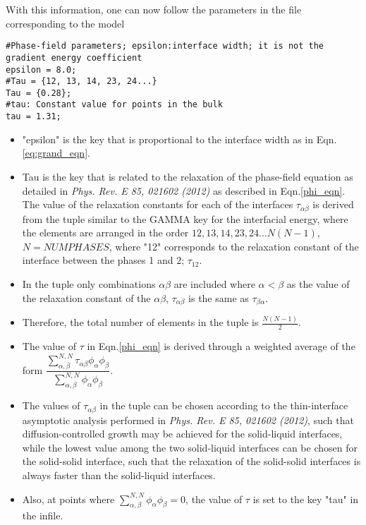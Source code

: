 \documentclass[a4paper,10pt]{article}
\begin{document}
With this information, one can now follow the parameters in the file corresponding to the model

\begin{lstlisting}
#Phase-field parameters; epsilon:interface width; it is not the gradient energy coefficient
epsilon = 8.0;
#Tau = {12, 13, 14, 23, 24...}
Tau = {0.28};
#tau: Constant value for points in the bulk
tau = 1.31;
\end{lstlisting}

\begin{itemize}
 \item "epsilon" is the key that is proportional to the interface width as in Eqn.\ref{eq:grand_eqn}.
 \item Tau is the key that is related to the relaxation of the phase-field equation as detailed in \textit{Phys. Rev. E 85, 021602 (2012)}
 as described in Eqn.\ref{phi_eqn}. The value of the relaxation constants for each of the interfaces $\tau_{\alpha\beta}$ is derived from the 
 tuple similar to the GAMMA key for the interfacial energy, where the elements are arranged in the order ${12,13,14,23,24 \ldots N(N-1)}$, $N=NUMPHASES$,
 where "12" corresponds to the relaxation constant of the interface between the phases 1 and 2; $\tau_{12}$.
 \item In the tuple only combinations $\alpha\beta$ are included where $\alpha<\beta$ as the value of the relaxation constant of the $\alpha\beta$, $\tau_{\alpha\beta}$ 
 is the same as $\tau_{\beta\alpha}$.
 \item Therefore, the total number of elements in the tuple is $\frac{N(N-1)}{2}$.
 \item The value of $\tau$ in Eqn.\ref{phi_eqn} is derived through a weighted average of the form 
 $\dfrac{\sum_{\alpha,\beta}^{N,N}\tau_{\alpha\beta}\phi_\alpha\phi_\beta}{\sum_{\alpha,\beta}^{N,N}\phi_\alpha\phi_\beta}$.
 \item The values of $\tau_{\alpha\beta}$ in the tuple can be chosen according to the thin-interface asymptotic analysis 
performed in \textit{Phys. Rev. E 85, 021602 (2012)}, such that diffusion-controlled growth may be achieved for the solid-liquid interfaces, 
while the lowest value among the two solid-liquid interfaces can be chosen for the solid-solid interface, such that the relaxation of the solid-solid interfaces 
is always faster than the solid-liquid interfaces. 
\item Also, at points where $\sum_{\alpha,\beta}^{N,N}\phi_\alpha\phi_\beta = 0$, the value of $\tau$ is set to the key "tau" in the infile.
\end{itemize}
\end{document}
